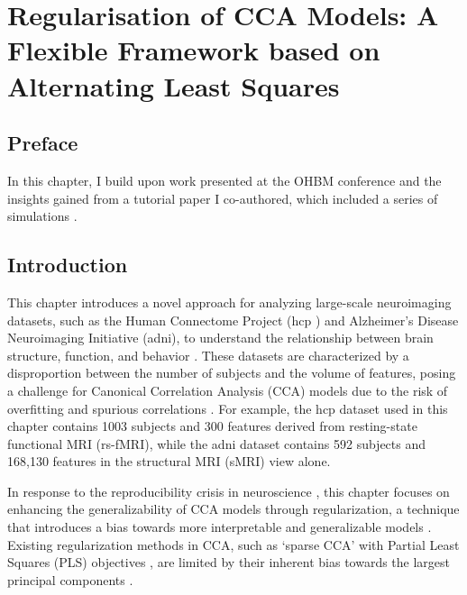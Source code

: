 \graphicspath{{chapters/regularisation}}


\chapter{Regularisation of CCA Models: A Flexible Framework based on Alternating Least Squares}\label{ch:als}

\minitoc
\section*{Preface}

In this chapter, I build upon work presented at the OHBM conference \citep{chapman2023als} and the insights gained from a tutorial paper I co-authored, which included a series of simulations \citep{mihalik2022canonical}.

\section{Introduction}\label{sec:introduction}

This chapter introduces a novel approach for analyzing large-scale neuroimaging datasets, such as the Human Connectome Project (\acrshort{hcp} \citep{van2013wu}) and Alzheimer's Disease Neuroimaging Initiative (\acrshort{adni}), to understand the relationship between brain structure, function, and behavior \citep{SMITH2018263,BZDOK2017549,wang2020finding}.
These datasets are characterized by a disproportion between the number of subjects and the volume of features, posing a challenge for Canonical Correlation Analysis (CCA) models due to the risk of overfitting and spurious correlations \citep{wang2018finding}.
For example, the \acrshort{hcp} dataset used in this chapter contains 1003 subjects and 300 features derived from resting-state functional MRI (rs-fMRI), while the \acrshort{adni} dataset contains 592 subjects and 168,130 features in the structural MRI (sMRI) view alone.

In response to the reproducibility crisis in neuroscience \citep{button2013power}, this chapter focuses on enhancing the generalizability of CCA models through regularization, a technique that introduces a bias towards more interpretable and generalizable models \citep{engl1996regularisation,bzdok2019towards}.
Existing regularization methods in CCA, such as `sparse CCA' with Partial Least Squares (PLS) objectives \citep{le2008sparse,witten2009penalized,lindenbaum2021l0}, are limited by their inherent bias towards the largest principal components \citep{mihalik_canonical_2022}.

